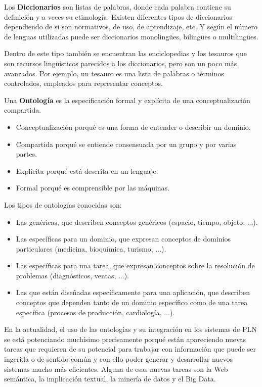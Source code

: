 \documentclass[11pt]{exam}
\begin{document}
\begin{questions}
Los {\bf Diccionarios} son listas de palabras, donde cada palabra contiene su definición y a veces su etimología. Existen diferentes tipos de diccionarios dependiendo de si son normativos, de uso, de aprendizaje, etc. Y según el número de lenguas utilizadas puede ser diccionarios monolingües, bilingües o multilingües.

Dentro de este tipo también se encuentran las enciclopedias y los tesauros que son recursos lingüísticos parecidos a los diccionarios, pero son un poco más avanzados. Por ejemplo, un tesauro es una lista de palabras o términos controlados, empleados para representar conceptos.

Una {\bf Ontología} es la especificación formal y explícita de una conceptualización compartida.

\begin{itemize}
	\item Conceptualización porqué es una forma de entender o describir un dominio. 
	\item Compartida porqué se entiende consensuada por un grupo y por varias partes.
	\item Explícita porqué está descrita en un lenguaje.
	\item Formal porqué es comprensible por las máquinas.
\end{itemize}

Los tipos de ontologías conocidas son:

\begin{itemize}
	\item Las genéricas, que describen conceptos genéricos (espacio, tiempo, objeto, ...).
	\item Las específicas para un dominio, que expresan conceptos de dominios particulares (medicina, bioquímica, turismo, ...).
	\item Las específicas para una tarea, que expresan conceptos sobre la resolución de problemas (diagnósticos, ventas, ...).
	\item Las que están diseñadas específicamente para una aplicación, que describen conceptos que dependen tanto de un dominio específico como de una tarea específica
	(procesos de producción, cardiología, ...).
\end{itemize}

En la actualidad, el uso de las ontologías y su integración en los sistemas de PLN se está potenciando muchísimo precisamente porqué están apareciendo nuevas tareas que requieren de su potencial para trabajar con información que puede ser ingerida o de sentido común y con ello poder generar y desarrollar nuevos sistemas mucho más eficientes. Alguna de esas nuevas tareas son la Web semántica, la implicación textual, la minería de datos y el Big Data. 


\end{questions}
\end{document}
